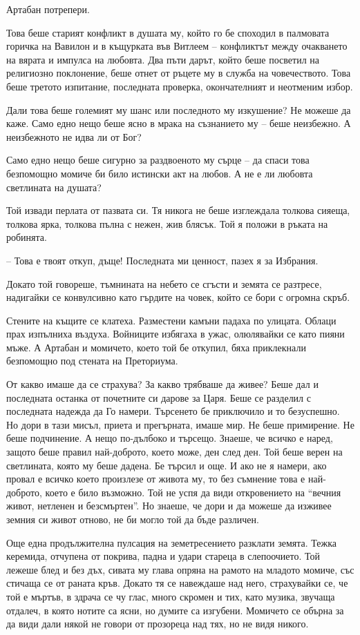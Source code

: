 Артабан потрепери.

Това беше старият конфликт в душата му, който го бе споходил в палмовата горичка
на Вавилон и в къщурката във Витлеем -- конфликтът между очакването на вярата и
импулса на любовта. Два пъти дарът, който беше посветил на религиозно
поклонение, беше отнет от ръцете му в служба на човечеството. Това беше третото
изпитание, последната проверка, окончателният и неотменим избор.

Дали това беше големият му шанс или последното му изкушение? Не можеше да каже.
Само едно нещо беше ясно в мрака на съзнанието му -- беше неизбежно. А
неизбежното не идва ли от Бог?

Само едно нещо беше сигурно за раздвоеното му сърце -- да спаси това безпомощно
момиче би било истински акт на любов. А не е ли любовта светлината на душата?

Той извади перлата от пазвата си. Тя никога не беше изглеждала толкова сияеща,
толкова ярка, толкова пълна с нежен, жив блясък. Той я положи в ръката на
робинята.

-- Това е твоят откуп, дъще! Последната ми ценност, пазех я за Избрания.

Докато той говореше, тъмнината на небето се сгъсти и земята се разтресе,
надигайки се конвулсивно като гърдите на човек, който се бори с огромна скръб.

Стените на къщите се клатеха. Разместени камъни падаха по улицата. Облаци прах
изпълниха въздуха. Войниците избягаха в ужас, олюлявайки се като пияни мъже. А
Артабан и момичето, което той бе откупил, бяха приклекнали безпомощно под
стената на Преториума.

От какво имаше да се страхува? За какво трябваше да живее? Беше дал и последната
останка от почетните си дарове за Царя. Беше се разделил с последната надежда да
Го намери. Търсенето бе приключило и то безуспешно. Но дори в тази мисъл, приета
и прегърната, имаше мир. Не беше примирение. Не беше подчинение. А нещо
по-дълбоко и търсещо. Знаеше, че всичко е наред, защото беше правил най-доброто,
което може, ден след ден. Той беше верен на светлината, която му беше дадена. Бе
търсил и още. И ако не я намери, ако провал е всичко което произлезе от живота
му, то без съмнение това е най-доброто, което е било възможно. Той не успя да
види откровението на ``вечния живот, нетленен и безсмъртен''. Но знаеше, че дори
и да можеше да изживее земния си живот отново, не би могло той да бъде различен.

Още една продължителна пулсация на земетресението разклати земята. Тежка
керемида, отчупена от покрива, падна и удари стареца в слепоочието. Той лежеше
блед и без дъх, сивата му глава опряна на рамото на младото момиче, със стичаща
се от раната кръв. Докато тя се навеждаше над него, страхувайки се, че той е
мъртъв, в здрача се чу глас, много скромен и тих, като музика, звучаща отдалеч,
в която нотите са ясни, но думите са изгубени. Момичето се обърна за да види
дали някой не говори от прозореца над тях, но не видя никого.

